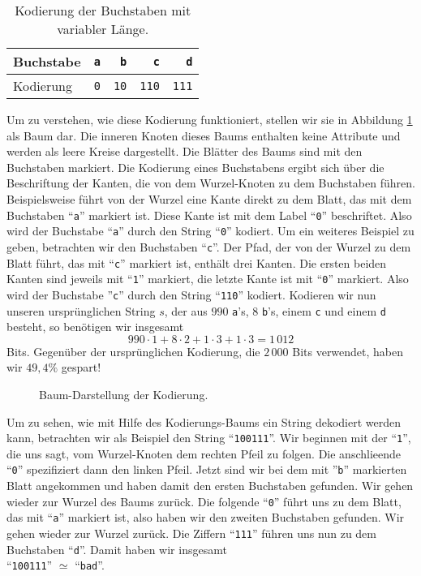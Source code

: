 \begin{table}[htbp]
  \centering
\begin{tabular}[t]{|l|r|r|r|r|}
\hline
Buchstabe & \texttt{a} & \texttt{b}  & \texttt{c}   & \texttt{d}   \\
\hline
Kodierung & \texttt{0} & \texttt{10} & \texttt{110} & \texttt{111} \\
\hline
\end{tabular}
  \caption{Kodierung der Buchstaben mit variabler L\"ange.}
  \label{tab:coding}
\end{table}

Um zu verstehen, wie diese Kodierung funktioniert, stellen wir sie in
Abbildung \ref{fig:coding-tree} als Baum dar.  Die inneren 
Knoten dieses Baums enthalten keine Attribute und werden als leere Kreise dargestellt.
Die Bl\"atter des Baums sind mit den Buchstaben markiert.
Die Kodierung eines Buchstabens ergibt sich \"uber die Beschriftung der Kanten, die von dem
Wurzel-Knoten zu dem Buchstaben f\"uhren.  Beispielsweise f\"uhrt von der Wurzel eine
Kante direkt zu dem Blatt, das mit dem Buchstaben ``\texttt{a}'' markiert ist.  Diese
Kante ist mit dem Label ``\texttt{0}'' beschriftet.  Also wird der Buchstabe
``\texttt{a}'' durch den String ``\texttt{0}'' kodiert.  Um ein weiteres Beispiel zu
geben, betrachten wir den Buchstaben ``\texttt{c}''.   Der Pfad, der von der Wurzel zu dem
Blatt f\"uhrt, das mit ``\texttt{c}'' markiert ist, enth\"alt drei Kanten.  Die ersten beiden
Kanten sind jeweils mit ``\texttt{1}'' markiert, die letzte Kante ist mit ``\texttt{0}''
markiert.  Also wird der Buchstabe ''\texttt{c}'' durch den String ``\texttt{110}''
kodiert.  Kodieren wir nun unseren urspr\"unglichen String $s$, der aus $990$
\texttt{a}'s, $8$ \texttt{b}'s, einem \texttt{c} und einem \texttt{d} besteht, so
ben\"otigen wir insgesamt
\[ 990 \cdot 1 + 8 \cdot 2 + 1 \cdot 3 + 1 \cdot 3 = 1\,012 \]
Bits.  Gegen\"uber der urspr\"unglichen Kodierung, die $2\,000$ Bits verwendet, haben wir $49,4\%$
gespart!

\begin{figure}[!ht]
  \centering
  \caption{Baum-Darstellung der Kodierung.}
  \label{fig:coding-tree}
\end{figure}

Um zu sehen, wie mit Hilfe des Kodierungs-Baums ein String dekodiert werden kann,
betrachten wir als Beispiel den String ``\texttt{100111}''.  Wir beginnen mit der
``\texttt{1}'', die uns sagt, vom Wurzel-Knoten dem rechten Pfeil zu folgen.  Die
anschlie\3ende ``\texttt{0}'' spezifiziert dann den linken Pfeil.  Jetzt sind wir bei dem
mit ''\texttt{b}'' markierten Blatt angekommen und haben damit den ersten Buchstaben
gefunden.  Wir gehen wieder zur Wurzel des Baums zur\"uck. Die folgende ``\texttt{0}'' f\"uhrt
uns zu dem Blatt, das mit ``\texttt{a}'' markiert ist, also haben wir den zweiten
Buchstaben gefunden. Wir gehen wieder zur Wurzel zur\"uck.  Die Ziffern ``\texttt{111}''
f\"uhren uns nun zu dem Buchstaben ``\texttt{d}''.  Damit haben wir insgesamt
\\[0.2cm]
\hspace*{1.3cm}
``\texttt{100111}'' $\simeq$ ``\texttt{bad}''.


